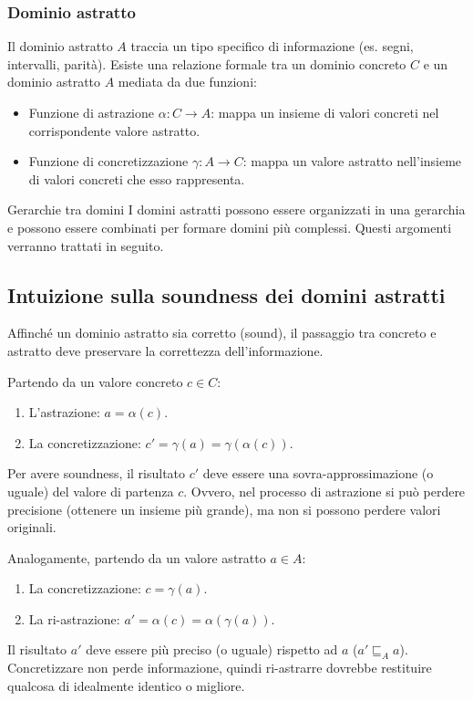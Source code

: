 \subsubsection{Dominio astratto}
Il dominio astratto $A$ traccia un tipo specifico di informazione
(es. segni, intervalli, parità).
Esiste una relazione formale tra un dominio concreto $C$ e un dominio astratto
$A$ mediata da due funzioni:
\begin{itemize}
    \item Funzione di astrazione $\alpha: C \rightarrow A$: mappa un insieme
    di valori concreti nel corrispondente valore astratto.
    \item Funzione di concretizzazione $\gamma: A \rightarrow C$: mappa un
    valore astratto nell'insieme di valori concreti che esso rappresenta.
\end{itemize}

\begin{nota}{Gerarchie tra domini}{}
I domini astratti possono essere organizzati in una gerarchia e possono essere
combinati per formare domini più complessi.
Questi argomenti verranno trattati in seguito.
\end{nota}

\subsection{Intuizione sulla soundness dei domini astratti}

Affinché un dominio astratto sia corretto (sound), il passaggio tra
concreto e astratto deve preservare la correttezza dell'informazione.

Partendo da un valore concreto $c \in C$:
\begin{enumerate}
    \item L'astrazione: $a = \alpha(c)$.
    \item La concretizzazione: $c' = \gamma(a) = \gamma(\alpha(c))$.
\end{enumerate}
Per avere soundness, il risultato $c'$ deve essere una sovra-approssimazione
(o uguale) del valore di partenza $c$.
Ovvero, nel processo di astrazione si può perdere precisione (ottenere
un insieme più grande), ma non si possono perdere valori originali.

Analogamente, partendo da un valore astratto $a \in A$:
\begin{enumerate}
    \item La concretizzazione: $c = \gamma(a)$.
    \item La ri-astrazione: $a' = \alpha(c) = \alpha(\gamma(a))$.
\end{enumerate}
Il risultato $a'$ deve essere più preciso (o uguale) rispetto ad
$a$ ($a' \sqsubseteq_A a$). Concretizzare non perde informazione, quindi
ri-astrarre dovrebbe restituire qualcosa di idealmente identico o migliore.

